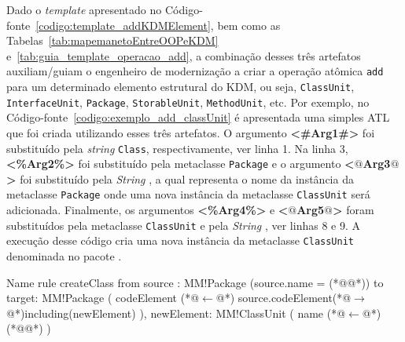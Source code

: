 Dado o \textit{template} apresentado no Código-fonte~\ref{codigo:template_addKDMElement}, bem como as Tabelas~\ref{tab:mapemanetoEntreOOPeKDM} e~\ref{tab:guia_template_operacao_add}, a combinação desses três artefatos auxiliam/guiam o engenheiro de modernização a criar a operação atômica \texttt{add} para um determinado elemento estrutural do KDM, ou seja, \texttt{ClassUnit}, \texttt{InterfaceUnit}, \texttt{Package}, \texttt{StorableUnit}, \texttt{MethodUnit}, etc. Por exemplo, 
%
%
%
%
%
no Código-fonte~\ref{codigo:exemplo_add_classUnit} é apresentada uma simples ATL que foi criada utilizando esses três artefatos. O argumento \textbf{<\#Arg1\#>} foi substituído pela \textit{string} \texttt{Class}, respectivamente, ver linha 1. Na linha 3, \textbf{<\%Arg2\%>} foi substituído pela metaclasse \texttt{Package} e o argumento \textbf{<$@$Arg3$@$>} foi substituído pela \textit{String} \texttt{}, a qual representa o nome da instância da metaclasse \texttt{Package} onde uma nova instância da metaclasse \texttt{ClassUnit} será adicionada. Finalmente, os argumentos \textbf{<\%Arg4\%>} e \textbf{<$@$Arg5$@$>} foram substituídos pela metaclasse \texttt{ClassUnit} e pela \textit{String} \texttt{}, ver linhas 8 e 9.  A execução desse código cria uma nova instância da metaclasse \texttt{ClassUnit} denominada  no pacote .

\begin{codigo}[caption={[ATL para realizar a operação atômica \texttt{add} \texttt{ClassUnit}.] ATL para realizar a operação atômica \texttt{add} \texttt{ClassUnit}.},escapeinside={(*@}{@*)}, basicstyle=\footnotesize, label={codigo:exemplo_add_classUnit}, language=ATL]{Name}
rule createClass{
	from
		source : MM!Package (source.name = (*@@*))
	to 
		target: MM!Package (
			codeElement (*@$\leftarrow$@*) source.codeElement(*@$\rightarrow$@*)including(newElement)
		),
		newElement: MM!ClassUnit (
			name (*@$\leftarrow$@*) (*@@*)
		)
}
\end{codigo}


